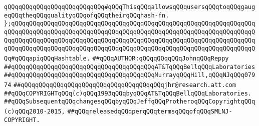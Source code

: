 \verb|qQQqqQQqqQQqqQQqqQQqqQQqqQQq#qQQqThisqQQqallowsqQQqusersqQQqtoqQQqgaugeqQQqtheqQQqqualityqQQqofqQQqtheirqQQqhash-fn.|\newline
\verb|};qQQqqQQqqQQqqQQqqQQqqQQqqQQqqQQqqQQqqQQqqQQqqQQqqQQqqQQqqQQqqQQqqQQqqQQqqQQqqQQqqQQqqQQqqQQqqQQqqQQqqQQqqQQqqQQqqQQqqQQqqQQqqQQqqQQqqQQqqQQqqQQqqQQqqQQqqQQqqQQqqQQqqQQqqQQqqQQqqQQqqQQqqQQqqQQqqQQqqQQqqQQqqQQqqQQqqQQqqQQqqQQqqQQqqQQqqQQqqQQqqQQqqQQqqQQqqQQqqQQqqQQqqQQqqQQqqQQqqQQq#qQQqapiqQQqHashtable.|\newline
\newline
\newline
\verb|##qQQqAUTHOR:qQQqqQQqqQQqJohnqQQqReppy|\newline
\verb|##qQQqqQQqqQQqqQQqqQQqqQQqqQQqqQQqqQQqqQQqAT&TqQQqBellqQQqLaboratories|\newline
\verb|##qQQqqQQqqQQqqQQqqQQqqQQqqQQqqQQqqQQqqQQqMurrayqQQqHill,qQQqNJqQQq07974|\newline
\verb|##qQQqqQQqqQQqqQQqqQQqqQQqqQQqqQQqqQQqqQQqjhr@research.att.com|\newline
\verb|##qQQqCOPYRIGHTqQQq(c)qQQq1993qQQqbyqQQqAT&TqQQqBellqQQqLaboratories.|\newline
\verb|##qQQqSubsequentqQQqchangesqQQqbyqQQqJeffqQQqProtheroqQQqCopyrightqQQq(c)qQQq2010-2015,|\newline
\verb|##qQQqreleasedqQQqperqQQqtermsqQQqofqQQqSMLNJ-COPYRIGHT.|\newline

